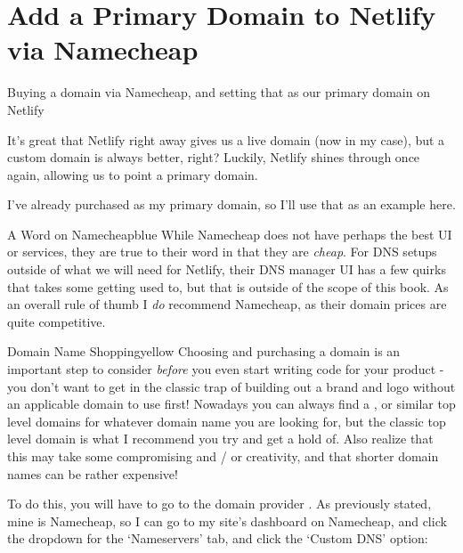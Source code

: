\documentclass[a4paper,
                             oneside,
                             BCOR1.0cm,
                             DIV11,
                             parskip=full,
                             11pt]{scrbook}
\begin{document}
\section{Add a Primary Domain to Netlify via Namecheap}\label{sec:titles}
\begin{arrows}
\item Buying a domain via Namecheap, and setting that as our primary domain on Netlify
\end{arrows}

It's great that Netlify right away gives us a live domain (now  in my case), but a custom domain is always better, right? Luckily, Netlify shines through once again, allowing us to point a primary domain.

I've already purchased  as my primary domain, so I'll use that as an example here.

\begin{highlightBox}{A Word on Namecheap}{blue}{\information}
While Namecheap does not have perhaps the best UI or services, they are true to their word in that they are \textit{cheap}. For DNS setups outside of what we will need for Netlify, their DNS manager UI has a few quirks that takes some getting used to, but that is outside of the scope of this book. As an overall rule of thumb I \textit{do} recommend Namecheap, as their domain prices are quite competitive.
\end{highlightBox}

\begin{highlightBox}{Domain Name Shopping}{yellow}{\warning}
Choosing and purchasing a domain is an important step to consider \textit{before} you even start writing code for your product - you don't want to get in the classic trap of building out a brand and logo without an applicable domain to use first! Nowadays you can always find a ,  or similar top level domains for whatever domain name you are looking for, but the classic top level domain  is what I recommend you try and get a hold of. Also realize that this may take some compromising and / or creativity, and that shorter domain names can be rather expensive!
\end{highlightBox}


To do this, you will have to go to the domain provider . As previously stated, mine is Namecheap, so I can go to my site's dashboard on Namecheap, and click the dropdown for the `Nameservers' tab, and click the `Custom DNS' option:
\end{document}
